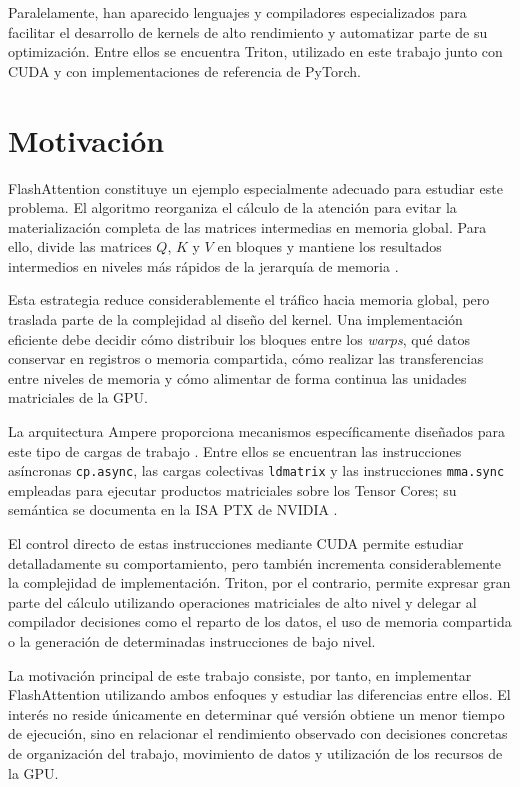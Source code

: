 Paralelamente, han aparecido lenguajes y compiladores especializados para facilitar el desarrollo de kernels de alto rendimiento y automatizar parte de su optimización. Entre ellos se encuentra Triton, utilizado en este trabajo junto con CUDA y con implementaciones de referencia de PyTorch.

\section{Motivación}

FlashAttention constituye un ejemplo especialmente adecuado para estudiar este problema. El algoritmo reorganiza el cálculo de la atención para evitar la materialización completa de las matrices intermedias en memoria global. Para ello, divide las matrices \(Q\), \(K\) y \(V\) en bloques y mantiene los resultados intermedios en niveles más rápidos de la jerarquía de memoria \cite{dao2022flashattention}.

Esta estrategia reduce considerablemente el tráfico hacia memoria global, pero traslada parte de la complejidad al diseño del kernel. Una implementación eficiente debe decidir cómo distribuir los bloques entre los \textit{warps}, qué datos conservar en registros o memoria compartida, cómo realizar las transferencias entre niveles de memoria y cómo alimentar de forma continua las unidades matriciales de la GPU.

La arquitectura Ampere proporciona mecanismos específicamente diseñados para este tipo de cargas de trabajo \cite{nvidiaAmpere}. Entre ellos se encuentran las instrucciones asíncronas \texttt{cp.async}, las cargas colectivas \texttt{ldmatrix} y las instrucciones \texttt{mma.sync} empleadas para ejecutar productos matriciales sobre los Tensor Cores; su semántica se documenta en la ISA PTX de NVIDIA \cite{nvidiaPTX}.

El control directo de estas instrucciones mediante CUDA permite estudiar detalladamente su comportamiento, pero también incrementa considerablemente la complejidad de implementación. Triton, por el contrario, permite expresar gran parte del cálculo utilizando operaciones matriciales de alto nivel y delegar al compilador decisiones como el reparto de los datos, el uso de memoria compartida o la generación de determinadas instrucciones de bajo nivel.

La motivación principal de este trabajo consiste, por tanto, en implementar FlashAttention utilizando ambos enfoques y estudiar las diferencias entre ellos. El interés no reside únicamente en determinar qué versión obtiene un menor tiempo de ejecución, sino en relacionar el rendimiento observado con decisiones concretas de organización del trabajo, movimiento de datos y utilización de los recursos de la GPU.

